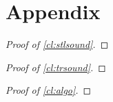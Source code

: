 \section*{Appendix}

\begin{proof}[Proof of \cref{cl:stlsound}]
	\TODO
\end{proof}

\begin{proof}[Proof of \cref{cl:trsound}]
	\TODO
\end{proof}

\begin{proof}[Proof of \cref{cl:algo}]
	\TODO
\end{proof}